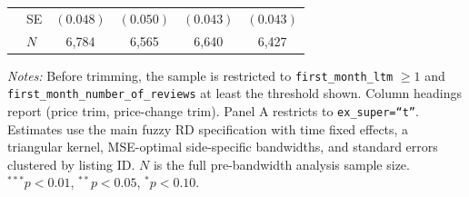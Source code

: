 \begin{table}[!htbp]
\begin{tabular}{llcccc}
 & SE & $(0.048)$ & $(0.050)$ & $(0.043)$ & $(0.043)$ \\
 & $N$ & 6,784 & 6,565 & 6,640 & 6,427 \\
\bottomrule
\end{tabular}
\begin{minipage}{0.96\textwidth}
\footnotesize
\textit{Notes:} Before trimming, the sample is restricted to \texttt{first\_month\_ltm} $\geq 1$ and \texttt{first\_month\_number\_of\_reviews} at least the threshold shown. Column headings report (price trim, price-change trim). Panel A restricts to \texttt{ex\_super=``t''}. Estimates use the main fuzzy RD specification with time fixed effects, a triangular kernel, MSE-optimal side-specific bandwidths, and standard errors clustered by listing ID. $N$ is the full pre-bandwidth analysis sample size. $^{***}p<0.01$, $^{**}p<0.05$, $^{*}p<0.10$.
\end{minipage}
\end{table}
\clearpage


